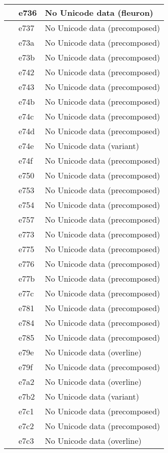 \documentclass[12pt,letterpaper,openany]{book}
\begin{document}
\begin{center}
\begin{supertabular}{|m{0.25in}|m{0.5in}|m{4in}|}
 & e736 & No Unicode data (fleuron)\\\hline
 & e737 & No Unicode data (precomposed)\\\hline
 & e73a & No Unicode data (precomposed)\\\hline
 & e73b & No Unicode data (precomposed)\\\hline
 & e742 & No Unicode data (precomposed)\\\hline
 & e743 & No Unicode data (precomposed)\\\hline
 & e74b & No Unicode data (precomposed)\\\hline
 & e74c & No Unicode data (precomposed)\\\hline
 & e74d & No Unicode data (precomposed)\\\hline
 & e74e & No Unicode data (variant)\\\hline
 & e74f & No Unicode data (precomposed)\\\hline
 & e750 & No Unicode data (precomposed)\\\hline
 & e753 & No Unicode data (precomposed)\\\hline
 & e754 & No Unicode data (precomposed)\\\hline
 & e757 & No Unicode data (precomposed)\\\hline
 & e773 & No Unicode data (precomposed)\\\hline
 & e775 & No Unicode data (precomposed)\\\hline
 & e776 & No Unicode data (precomposed)\\\hline
 & e77b & No Unicode data (precomposed)\\\hline
 & e77c & No Unicode data (precomposed)\\\hline
 & e781 & No Unicode data (precomposed)\\\hline
 & e784 & No Unicode data (precomposed)\\\hline
 & e785 & No Unicode data (precomposed)\\\hline
 & e79e & No Unicode data (overline)\\\hline
 & e79f & No Unicode data (precomposed)\\\hline
 & e7a2 & No Unicode data (overline)\\\hline
 & e7b2 & No Unicode data (variant)\\\hline
 & e7c1 & No Unicode data (precomposed)\\\hline
 & e7c2 & No Unicode data (precomposed)\\\hline
 & e7c3 & No Unicode data (overline)\\\hline

\end{supertabular}
\end{center}
\end{document}
